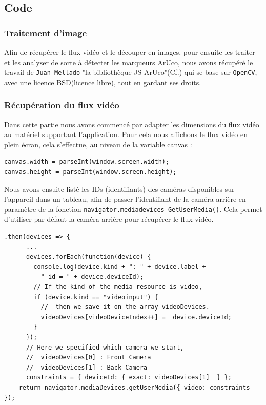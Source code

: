\documentclass[12pt,a4paper]{article}
\begin{document}
\subsection{Code}

\subsubsection{Traitement d'image}
Afin de récupérer le flux vidéo et le découper en images, pour ensuite les traiter et les analyser de sorte à détecter les marqueurs ArUco, nous avons récupéré le travail de \texttt{Juan Mellado} "la bibliothèque JS-ArUco"(Cf.\cite{Ref4}) qui se base sur \texttt{OpenCV}, avec une licence BSD(licence libre), tout en gardant ses droits.

\subsubsection*{Récupération du flux vidéo}

	Dans cette partie nous avons commencé par adapter les dimensions du flux vidéo au matériel supportant l'application. Pour cela nous affichons le flux vidéo en plein écran, cela s'effectue, au niveau de la variable canvas : 
\medskip
\begin{lstlisting}
canvas.width = parseInt(window.screen.width);
canvas.height = parseInt(window.screen.height);
\end{lstlisting}

	Nous avons ensuite listé les IDs (identifiants) des caméras disponibles sur l'appareil dans un tableau, afin de passer l'identifiant de la caméra arrière en paramètre de la fonction \texttt{navigator.mediadevices GetUserMedia()}. Cela permet d'utiliser par défaut la caméra arrière pour récupérer le flux vidéo.
\begin{lstlisting}
.then(devices => {
      ...
      devices.forEach(function(device) {
        console.log(device.kind + ": " + device.label +
          " id = " + device.deviceId);
        // If the kind of the media resource is video, 
        if (device.kind == "videoinput") {  
          //  then we save it on the array videoDevices.
          videoDevices[videoDeviceIndex++] =  device.deviceId;    
        }
      });
      // Here we specified which camera we start,
      //  videoDevices[0] : Front Camera
      //  videoDevices[1] : Back Camera 
      constraints = { deviceId: { exact: videoDevices[1]  } };
    return navigator.mediaDevices.getUserMedia({ video: constraints });

\end{lstlisting}
\end{document}
